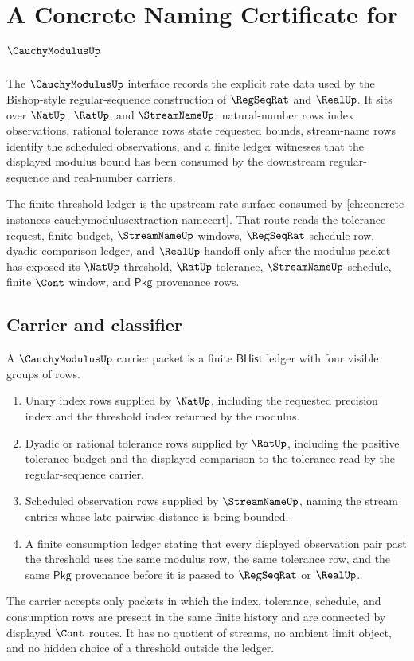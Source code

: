 \chapter{A Concrete Naming Certificate for $\CauchyModulusUp$}
\label{ch:concrete-instances-cauchymodulus-namecert}

The $\CauchyModulusUp$ interface records the explicit rate data used by the
Bishop-style regular-sequence construction of $\RegSeqRat$ and $\RealUp$. It
sits over $\NatUp$, $\RatUp$, and $\StreamNameUp$: natural-number rows index
observations, rational tolerance rows state requested bounds, stream-name rows
identify the scheduled observations, and a finite ledger witnesses that the
displayed modulus bound has been consumed by the downstream regular-sequence
and real-number carriers.

The finite threshold ledger is the upstream rate surface consumed by
\autoref{ch:concrete-instances-cauchymodulusextraction-namecert}. That route
reads the tolerance request, finite budget, $\StreamNameUp$ windows,
$\RegSeqRat$ schedule row, dyadic comparison ledger, and $\RealUp$ handoff only
after the modulus packet has exposed its $\NatUp$ threshold, $\RatUp$
tolerance, $\StreamNameUp$ schedule, finite $\Cont$ window, and $\mathsf{Pkg}$
provenance rows.

\section{Carrier and classifier}
\label{sec:cauchymodulus-carrier}

\begin{definition}
\label{def:cauchymodulus-carrier}
A $\CauchyModulusUp$ carrier packet is a finite $\mathsf{BHist}$ ledger with
four visible groups of rows.
\begin{enumerate}
\item Unary index rows supplied by $\NatUp$, including the requested precision
index and the threshold index returned by the modulus.
\item Dyadic or rational tolerance rows supplied by $\RatUp$, including the
positive tolerance budget and the displayed comparison to the tolerance read by
the regular-sequence carrier.
\item Scheduled observation rows supplied by $\StreamNameUp$, naming the
stream entries whose late pairwise distance is being bounded.
\item A finite consumption ledger stating that every displayed observation
pair past the threshold uses the same modulus row, the same tolerance row, and
the same $\mathsf{Pkg}$ provenance before it is passed to $\RegSeqRat$ or
$\RealUp$.
\end{enumerate}
The carrier accepts only packets in which the index, tolerance, schedule, and
consumption rows are present in the same finite history and are connected by
displayed $\Cont$ routes. It has no quotient of streams, no ambient limit
object, and no hidden choice of a threshold outside the ledger.
\end{definition}

